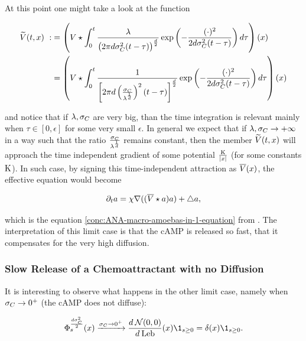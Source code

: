 At this point one might take a look at the function

\begin{align*}
	\widetilde{V}(t, x)\
	:&=
		\left(
		V \star 
		\int_0^t
		\frac{\lambda}{
			\big( 2\pi d\sigma_C^2 (t-\tau) \big)^{\frac{d}{2}}
		}
		\exp \left(
		-\frac{(\cdot)^2}{2 d\sigma_C^2 (t-\tau)}
		\right)
		d \tau
		\right) (x)
	\\
	&=
		\left(
		V \star 
		\int_0^t
		\frac{1}{
			\left[ 2\pi d
				\left(
					\frac{\sigma_C}{\lambda^\frac{1}{d}}
				\right)^2 (t-\tau)
			\right]^{\frac{d}{2}}
		}
		\exp \left(
		-\frac{(\cdot)^2}{2 d\sigma_C^2 (t-\tau)}
		\right)
		d \tau
		\right) (x)
\end{align*}

and notice that if $\lambda, \sigma_C$ are very big, than the time integration is relevant mainly when $\tau \in [0,\epsilon]$ for some very small $\epsilon$.
In general we expect that if $\lambda, \sigma_C \rightarrow +\infty$ in a way such that the ratio $\frac{\sigma_C}{\lambda^\frac{1}{d}}$ remains constant, then the member $\widetilde{V}(t, x)$ will approach the time independent gradient of some potential $\frac{\text{K}}{\left| x \right|}$ (for some constants $\text{K}$).
In such case, by signing this time-independent attraction as $\overline{V} (x)$, the effective equation would become

\begin{equation}
	\partial_t a = \chi \nabla ( (\overline{V} \star a) a) + \bigtriangleup a,
\end{equation}

which is the equation \ref{conc:ANA-macro-amoebas-in-1-equation} from \cite{ana}.
The interpretation of this limit case is that the cAMP is released so fast, that it compensates for the very high diffusion.

\subsubsection{Slow Release of a Chemoattractant with no Diffusion}

It is interesting to observe what happens in the other limit case, namely when $\sigma_C\rightarrow0^+$ (\ie the cAMP does not diffuse):

\begin{equation*}
	\heatkernel_s^{\frac{d\sigma_\camp^2}{2}}(x)
	\xrightarrow{\diffusion_\camp \rightarrow 0^+}
	\frac{d\: \Normal(0, 0)}{d\:\lebsge} (x)
	\1_{s\geq 0} 
	=
	\delta(x) \1_{s\geq 0}.
\end{equation*}

